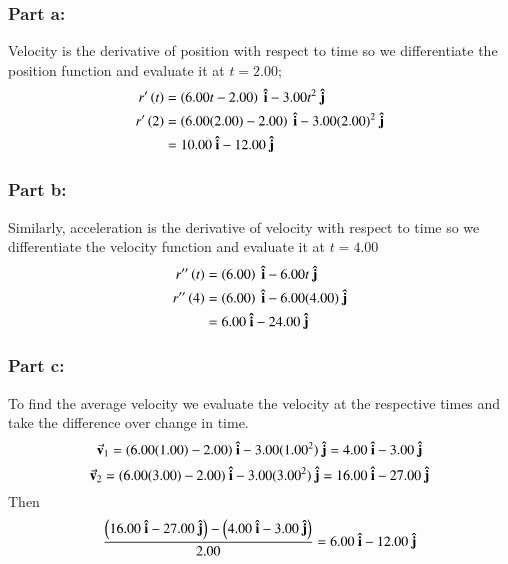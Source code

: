 \documentclass{article}
\begin{document}
\subsubsection*{Part a:}
Velocity is the derivative of position with respect to time so we differentiate the position function and evaluate it at $t=2.00$;
\begin{align*}
	r^\prime \left( t \right) &= \left(6.00 t - 2.00 \right)\ \vu i - 3.00t^2\ \vu j \\
	r^\prime \left( 2 \right) &= \left(6.00 (2.00) - 2.00 \right)\ \vu i - 3.00(2.00)^2\ \vu j \\
				  &= 10.00\ \vu i - 12.00\ \vu j
\end{align*}
\subsubsection*{Part b:}
Similarly, acceleration is the derivative of velocity with respect to time so we differentiate the velocity function and evaluate it at $t=4.00$
\begin{align*}
	r^{\prime\prime} \left( t \right) &= \left(6.00\right)\ \vu i - 6.00t\ \vu j \\
	r^{\prime\prime} \left( 4 \right) &= \left(6.00\right)\ \vu i - 6.00(4.00)\ \vu j \\
				  &= 6.00\ \vu i - 24.00\ \vu j
\end{align*}

\subsubsection*{Part c:}
To find the average velocity we evaluate the velocity at the respective times and take the difference over change in time.
\[
	\va v_1 = (6.00(1.00) - 2.00)\ \vu i - 3.00(1.00^2)\ \vu j  = 4.00\ \vu i - 3.00\ \vu j
\]
\[
	\va v_2 = (6.00(3.00) - 2.00)\ \vu i - 3.00(3.00^2)\ \vu j = 16.00\ \vu i - 27.00\ \vu j
\]
Then
\[
	\frac{\left( 16.00\ \vu i - 27.00\ \vu j \right) - \left( 4.00\ \vu i - 3.00\ \vu j \right)}{2.00} = 6.00\ \vu i -12.00\ \vu j
\]
\end{document}

